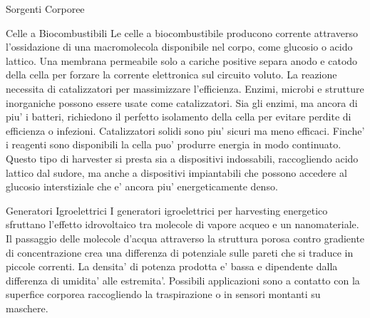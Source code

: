 \begin{section}{Sorgenti Corporee}
   \begin{subsection}{Celle a Biocombustibili}
    Le celle a biocombustibile producono corrente attraverso l'ossidazione di una macromolecola disponibile nel corpo, come glucosio o acido lattico. Una membrana permeabile solo a cariche positive separa anodo e catodo della cella per forzare la corrente elettronica sul circuito voluto. La reazione necessita di catalizzatori per massimizzare l'efficienza. Enzimi, microbi e strutture inorganiche possono essere usate come catalizzatori. Sia gli enzimi, ma ancora di piu' i batteri, richiedono il perfetto isolamento della cella per evitare perdite di efficienza o infezioni. Catalizzatori solidi sono piu' sicuri ma meno efficaci. Finche' i reagenti sono disponibili la cella puo' produrre energia in modo continuato. Questo tipo di harvester si presta sia a dispositivi indossabili, raccogliendo acido lattico dal sudore, ma anche a dispositivi impiantabili che possono accedere al glucosio interstiziale che e' ancora piu' energeticamente denso. 
   \end{subsection}

   \begin{subsection}{Generatori Igroelettrici}
    I generatori igroelettrici per harvesting energetico sfruttano l'effetto idrovoltaico tra molecole di vapore acqueo e un nanomateriale. Il passaggio delle molecole d'acqua attraverso la struttura porosa contro gradiente di concentrazione crea una differenza di potenziale sulle pareti che si traduce in piccole correnti. La densita' di potenza prodotta e' bassa e dipendente dalla differenza di umidita' alle estremita'. Possibili applicazioni sono a contatto con la superfice corporea raccogliendo la traspirazione o in sensori montanti su maschere. 
   \end{subsection}
\end{section}


